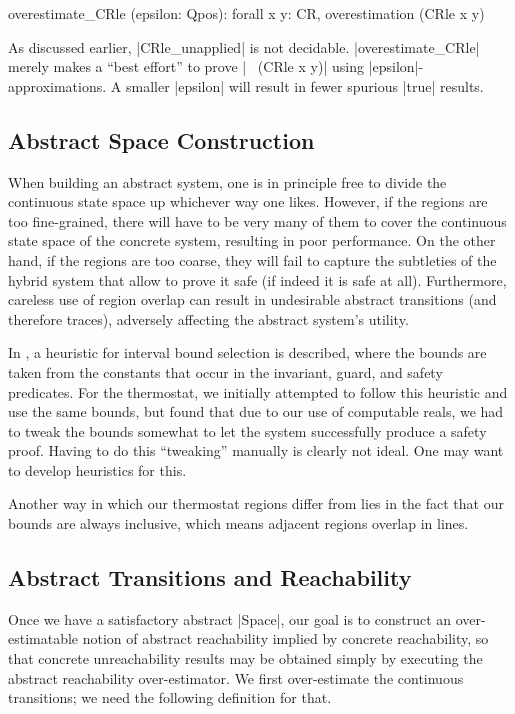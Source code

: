 \documentclass[runningheads]{llncs}
\begin{document}
\begin{code}
overestimate_CRle (epsilon: Qpos): forall x y: CR, overestimation (CRle x y)
\end{code}
As discussed earlier, |CRle_unapplied| is not
decidable. |overestimate_CRle| merely makes a ``best effort'' to prove
|~ (CRle x y)| using |epsilon|-approximations. A smaller |epsilon|
will result in fewer spurious |true| results.




\subsection{Abstract Space Construction}
\label{abs.space.constr}

When building an abstract system, one is in principle free to divide
the continuous state space up whichever way one likes. However, if the
regions are too fine-grained, there will have to be very many of them
to cover the continuous state space of the concrete system, resulting
in poor performance. On the other hand, if the regions are too coarse,
they will fail to capture the subtleties of the hybrid system that
allow to prove it safe (if indeed it is safe at all).  Furthermore,
careless use of region overlap can result in undesirable abstract
transitions (and therefore traces), adversely affecting the abstract
system's utility.

In \cite{alur}, a heuristic for interval bound selection is described,
where the bounds are taken from the constants that occur in the
invariant, guard, and safety predicates. For the thermostat, we
initially attempted to follow this heuristic and use the same bounds,
but found that due to our use of computable reals, we had to tweak the
bounds somewhat to let the system successfully produce a safety
proof. 
Having to do this ``tweaking'' manually is clearly not ideal. One may want to develop heuristics for this.


Another way in which our thermostat regions differ from \cite{alur}
lies in the fact that our bounds are always inclusive, which means
adjacent regions overlap in lines. 

\subsection{Abstract Transitions and Reachability}
\label{abs.reach}
Once we have a satisfactory abstract |Space|, our goal is to construct
an over-estimatable notion of abstract reachability implied by concrete
reachability, so that concrete unreachability results may be obtained
simply by executing the abstract reachability over-estimator. We first over-estimate the continuous transitions; we need the following definition for that.
\end{document}
